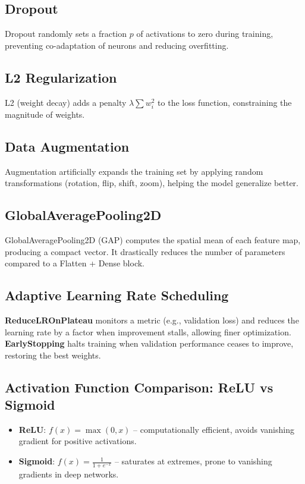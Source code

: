 \documentclass[11pt]{article}
\begin{document}
\subsection{Dropout}
Dropout randomly sets a fraction $p$ of activations to zero during training, preventing co-adaptation of neurons and reducing overfitting.

\subsection{L2 Regularization}
L2 (weight decay) adds a penalty $\lambda \sum w_i^2$ to the loss function, constraining the magnitude of weights.

\subsection{Data Augmentation}
Augmentation artificially expands the training set by applying random transformations (rotation, flip, shift, zoom), helping the model generalize better.

\subsection{GlobalAveragePooling2D}
GlobalAveragePooling2D (GAP) computes the spatial mean of each feature map, producing a compact vector. It drastically reduces the number of parameters compared to a Flatten + Dense block.

\subsection{Adaptive Learning Rate Scheduling}
\textbf{ReduceLROnPlateau} monitors a metric (e.g., validation loss) and reduces the learning rate by a factor when improvement stalls, allowing finer optimization. \textbf{EarlyStopping} halts training when validation performance ceases to improve, restoring the best weights.

\subsection{Activation Function Comparison: ReLU vs Sigmoid}
\begin{itemize}
    \item \textbf{ReLU}: $f(x) = \max(0, x)$ -- computationally efficient, avoids vanishing gradient for positive activations.
    \item \textbf{Sigmoid}: $f(x) = \frac{1}{1+e^{-x}}$ -- saturates at extremes, prone to vanishing gradients in deep networks.
\end{itemize}
\end{document}

